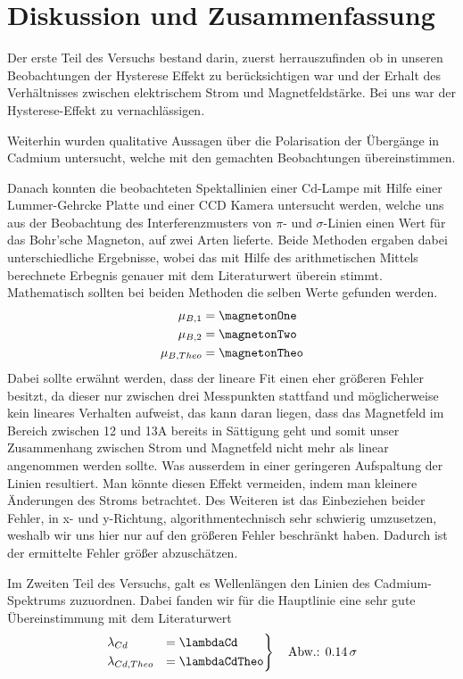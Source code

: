 \section{Diskussion und Zusammenfassung}
  Der erste Teil des Versuchs bestand darin, zuerst herrauszufinden ob in unseren Beobachtungen der Hysterese Effekt zu berücksichtigen war und der Erhalt des Verhältnisses zwischen elektrischem Strom und Magnetfeldstärke.
  Bei uns war der Hysterese-Effekt zu vernachlässigen.

  Weiterhin wurden qualitative Aussagen über die Polarisation der Übergänge in Cadmium untersucht, welche mit den gemachten Beobachtungen übereinstimmen.

  Danach konnten die beobachteten Spektallinien einer Cd-Lampe mit Hilfe einer Lummer-Gehrcke Platte und einer CCD Kamera untersucht werden, welche uns aus der Beobachtung des Interferenzmusters von $\pi$- und $\sigma$-Linien einen Wert für das Bohr'sche Magneton, auf zwei Arten lieferte. Beide Methoden ergaben dabei unterschiedliche Ergebnisse, wobei das mit Hilfe des arithmetischen Mittels berechnete Erbegnis genauer mit dem Literaturwert überein stimmt. Mathematisch sollten bei beiden Methoden die selben Werte gefunden werden.
  \begin{align*}
    \mu_{B,1} &= \magnetonOne\\
    \mu_{B,2} &= \magnetonTwo\\
    \mu_{B,Theo} & = \magnetonTheo
  \end{align*}
  Dabei sollte erwähnt werden, dass der lineare Fit einen eher größeren Fehler besitzt, da dieser nur zwischen drei Messpunkten stattfand und möglicherweise kein lineares Verhalten aufweist, das kann daran liegen, dass das Magnetfeld im Bereich zwischen 12 und 13A bereits in Sättigung geht und somit unser Zusammenhang zwischen Strom und Magnetfeld nicht mehr als linear angenommen werden sollte. Was ausserdem in einer geringeren Aufspaltung der Linien resultiert.
  Man könnte diesen Effekt vermeiden, indem man kleinere Änderungen des Stroms betrachtet.
  Des Weiteren ist das Einbeziehen beider Fehler, in x- und y-Richtung, algorithmentechnisch sehr schwierig umzusetzen, weshalb wir uns hier nur auf den größeren Fehler beschränkt haben. Dadurch ist der ermittelte Fehler größer abzuschätzen.

  Im Zweiten Teil des Versuchs, galt es Wellenlängen den Linien des Cadmium-Spektrums zuzuordnen. Dabei fanden wir für die Hauptlinie eine sehr gute Übereinstimmung mit dem Literaturwert
  \begin{align*}
    \begin{rcases}
      \lambda_{Cd} &=\lambdaCd \quad\\
      \lambda_{Cd, Theo} &= \lambdaCdTheo
    \end{rcases}
    \quad\text{Abw.: }\SI{.14}{\sigma}
  \end{align*}

